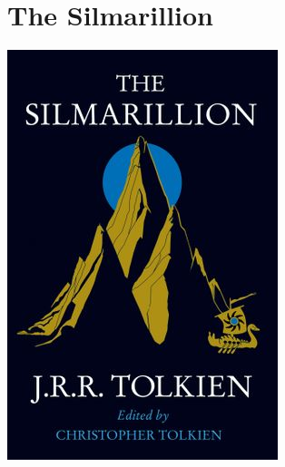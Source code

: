 \documentclass{tufte-handout}
\makeatletter
\newcommand{\varcaption}[2][0pt]{%
  \gsetlength{\@tufte@caption@vertical@offset}{-#1}%
  \gdef\@tufte@stored@varcaption{#2}%
}
\gdef\@tufte@stored@varcaption{} %
\makeatother
\begin{document}
\section*{The Silmarillion}
\begin{marginfigure}[6\baselineskip]
   \includegraphics[width=\linewidth]{images/silmarillion.jpg}
   \varcaption{\href{http://www.harpercollins.co.uk/9780007523221/the-silmarillion/}{Publisher Link}, \href{https://www.amazon.com/Silmarillion-J-R-R-Tolkien/dp/0544338014}{Amazon Link}}
\end{marginfigure}
\end{document}
